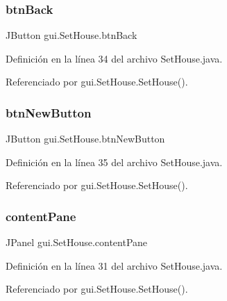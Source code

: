 \subsubsection{\texorpdfstring{btnBack}{btnBack}}
{\footnotesize\ttfamily J\+Button gui.\+Set\+House.\+btn\+Back\hspace{0.3cm}{\ttfamily [private]}}



Definición en la línea 34 del archivo Set\+House.\+java.



Referenciado por gui.\+Set\+House.\+Set\+House().

\mbox{\label{classgui_1_1_set_house_a51e87586b716545419f9b105039baba7}} 
\subsubsection{\texorpdfstring{btnNewButton}{btnNewButton}}
{\footnotesize\ttfamily J\+Button gui.\+Set\+House.\+btn\+New\+Button\hspace{0.3cm}{\ttfamily [private]}}



Definición en la línea 35 del archivo Set\+House.\+java.



Referenciado por gui.\+Set\+House.\+Set\+House().

\mbox{\label{classgui_1_1_set_house_a634e8201d87551eed6e180a40699e110}} 
\subsubsection{\texorpdfstring{contentPane}{contentPane}}
{\footnotesize\ttfamily J\+Panel gui.\+Set\+House.\+content\+Pane\hspace{0.3cm}{\ttfamily [private]}}



Definición en la línea 31 del archivo Set\+House.\+java.



Referenciado por gui.\+Set\+House.\+Set\+House().

\mbox{\label{classgui_1_1_set_house_ac2825921a399582ec53017704b5bf65f}} 
